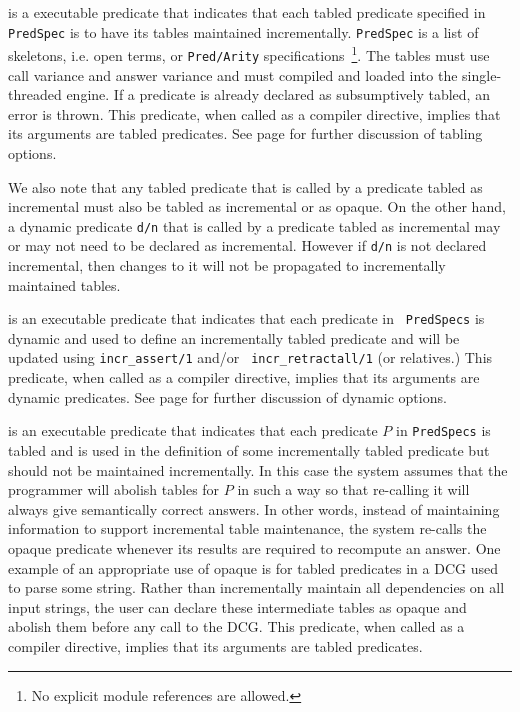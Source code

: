 \begin{description}

%
is a executable predicate that indicates that each tabled predicate
specified in {\tt PredSpec} is to have its tables maintained
incrementally.  {\tt PredSpec} is a list of skeletons, i.e. open
terms, or {\tt Pred/Arity} specifications~\footnote{No explicit module
  references are allowed.}.  The tables must use call variance and
answer variance and must compiled and loaded into the single-threaded
engine.  If a predicate is already declared as subsumptively tabled,
an error is thrown.  This predicate, when called as a compiler
directive, implies that its arguments are tabled predicates.  See page
\pageref{table-declaration} for further discussion of tabling options.

We also note that any tabled predicate that is called by a predicate
tabled as incremental must also be tabled as incremental or as opaque.
On the other hand, a dynamic predicate {\tt d/n} that is called by a
predicate tabled as incremental may or may not need to be declared as
incremental.  However if {\tt d/n} is not declared incremental, then
changes to it will not be propagated to incrementally maintained
tables.

%
is an executable predicate that indicates that each predicate in {\tt
  PredSpecs} is dynamic and used to define an incrementally tabled
predicate and will be updated using {\tt incr\_assert/1} and/or {\tt
  incr\_retractall/1} (or relatives.)  This predicate, when called as
a compiler directive, implies that its arguments are dynamic
predicates.  See page \pageref{dynamic-declaration} for further
discussion of dynamic options.

%
is an executable predicate that indicates that each predicate $P$ in
{\tt PredSpecs} is tabled and is used in the definition of some
incrementally tabled predicate but should not be maintained
incrementally.  In this case the system assumes that the programmer
will abolish tables for $P$ in such a way so that re-calling it will
always give semantically correct answers.  In other words, instead of
maintaining information to support incremental table maintenance, the
system re-calls the opaque predicate whenever its results are required
to recompute an answer.  One example of an appropriate use of opaque
is for tabled predicates in a DCG used to parse some string.  Rather
than incrementally maintain all dependencies on all input strings, the
user can declare these intermediate tables as opaque and abolish them
before any call to the DCG.  This predicate, when called as a compiler
directive, implies that its arguments are tabled predicates.

\end{description}

